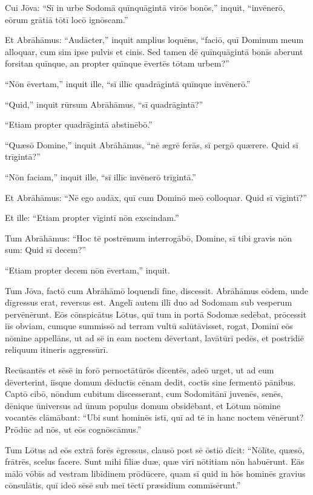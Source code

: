\Versus Cui Jōva: ``Sī in urbe Sodomā quīnquāgintā virōs bonōs,'' inquit, ``invēnerō, eōrum grātiā tōtī locō ignōscam.''

\Versus Et Abrāhāmus: ``Audācter,'' inquit amplius loquēns, ``faciō, quī Dominum meum alloquar, cum sim ipse pulvis et cinis.
\Versus Sed tamen dē quīnquāgintā bonīs aberunt forsitan quīnque, an propter quīnque ēvertēs tōtam urbem?''

``Nōn ēvertam,'' inquit ille, ``sī illīc quadrāgintā quīnque invēnerō.''

\Versus ``Quid,'' inquit rūrsum Abrāhāmus, ``sī quadrāgintā?''

``Etiam propter quadrāgintā abstinēbō.''

\Versus ``Quæsō Domine,'' inquit Abrāhāmus, ``nē ægrē ferās, sī pergō quærere. Quid sī trīgintā?''

``Nōn faciam,'' inquit ille, ``sī illīc invēnerō trīgintā.''

\Versus Et Abrāhāmus: ``Nē ego audāx, quī cum Dominō meō colloquar. Quid sī vīgintī?''

Et ille: ``Etiam propter vīgintī nōn exscindam.''

\Versus Tum Abrāhāmus: ``Hoc tē postrēmum interrogābō, Domine, sī tibi gravis nōn sum: Quid sī decem?''

``Etiam propter decem nōn ēvertam,'' inquit.



\Caput
\Versus Tum Jōva, factō cum Abrāhāmō loquendī fīne, discessit. Abrāhāmus eōdem, unde dīgressus erat, reversus est. Angelī autem illī duo ad Sodomam sub vesperum pervēnērunt. Eōs cōnspicātus Lōtus, quī tum in portā Sodomæ sedēbat, prōcessit iīs obviam, cumque summissō ad terram vultū salūtāvisset,
\Versus rogat, Dominī eōs nōmine appellāns, ut ad sē in eam noctem dēvertant, lavātūrī pedēs, et postrīdiē reliquum itineris aggressūrī.

Recūsantēs et sēsē in forō pernoctātūrōs dīcentēs,
\Versus adeō urget, ut ad eum dēverterint, iīsque domum dēductīs cēnam dedit, coctīs sine fermentō pānibus.
\Versus Captō cibō, nōndum cubitum discesserant, cum Sodomitānī juvenēs, senēs, dēnique ūniversus ad ūnum populus domum obsidēbant,
\Versus et Lōtum nōmine vocantēs clāmābant: ``Ubi sunt hominēs istī, quī ad tē in hanc noctem vēnērunt? Prōdūc ad nōs, ut eōs cognōscāmus.''

\Versus Tum Lōtus ad eōs extrā forēs ēgressus, clausō post sē ōstiō dīcit:
\Versus ``Nōlīte, quæsō, frātrēs, scelus facere.
\Versus Sunt mihi fīliæ duæ, quæ virī nōtitiam nōn habuērunt. Eās mālō vōbīs ad vestram libīdinem prōdūcere, quam sī quid in hōs hominēs gravius cōnsulātis, quī ideō sēsē sub meī tēctī præsidium commīsērunt.''

